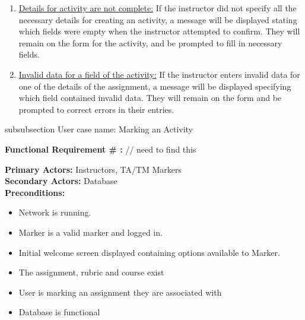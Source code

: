 \documentclass{article}
\begin{document}
\begin{enumerate}
	\item \underline{Details for activity are not complete:} If the instructor did not specify
			all the necessary details for creating an activity, a message will be displayed
			stating which fields were empty when the instructor attempted to confirm.
			They will remain on the form for the activity, and be prompted to fill in necessary
			fields.
	\item \underline{Invalid data for a field of the activity:} If the instructor enters invalid
			data for one of the details of the assignment, a message will be displayed
			specifying which field contained invalid data. They will remain on the form and
			be prompted to correct errors in their entries.
\end{enumerate}


subsubsection {User case name: Marking an Activity}

\textbf{Functional Requirement # :} // need to find this 

\textbf{Primary Actors:} Instructors, TA/TM Markers \\
\textbf{Secondary Actors:} Database \\
\textbf{Preconditions:}
\begin{itemize}
\item Network is running.
\item Marker is a valid marker and logged in.
\item Initial welcome screen displayed containing options available to Marker.
\item The assignment, rubric and course exist
\item User is marking an assignment they are associated with
\item Database is functional
\end {itemize}
\end{document}
